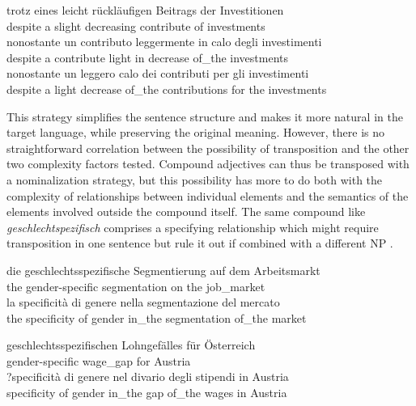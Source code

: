 \documentclass[output=paper,colorlinks,citecolor=brown]{langscibook}
\begin{document}
\ea%
    \label{ex:resi:67}
\ea
\gll  trotz  eines  leicht  rückläufigen  Beitrags  der  Investitionen \\
    despite  a     slight  decreasing  contribute  of  investments \\
\ex
\gll   *nonostante  un  contributo  leggermente  in calo  degli  investimenti\\
         despite  a  contribute  light  in decrease  of\_the   investments\\
\ex
\gll   nonostante  un  leggero  calo  dei  contributi  per  gli  investimenti\\
          despite  a  light  decrease  of\_the  contributions  for  the  investments\\
\z
\z

This strategy simplifies the sentence structure and makes it more natural in the target language, while preserving the original meaning. However, there is no straightforward correlation between the possibility of transposition and the other two complexity factors tested. Compound adjectives can thus be transposed with a nominalization strategy, but this possibility has more to do both with the complexity of relationships between individual elements and the semantics of the elements involved outside the compound itself. The same compound like \textit{geschlechtspezifisch} comprises a specifying relationship which might require transposition in one sentence  but rule it out if combined with a different NP .

\ea%
    \label{ex:resi:68}
\ea
\gll  die  geschlechtsspezifische  Segmentierung  auf  dem  Arbeitsmarkt \\
    the  gender-specific  segmentation  on   the  job\_market \\
\ex
\gll   la  specificità  di  genere  nella  segmentazione  del  mercato\\
  the  specificity  of  gender  in\_the  segmentation  of\_the  market\\
\z
\z

\ea%
    \label{ex:resi:69}
\ea
\gll  geschlechtsspezifischen  Lohngefälles  für  Österreich \\
    gender-specific  wage\_gap  for  Austria \\
\ex
\gll  ?specificità  di  genere  nel  divario  degli  stipendi  in  Austria\\
  specificity  of  gender  in\_the  gap  of\_the  wages  in  Austria\\
\z
\z
\end{document}
